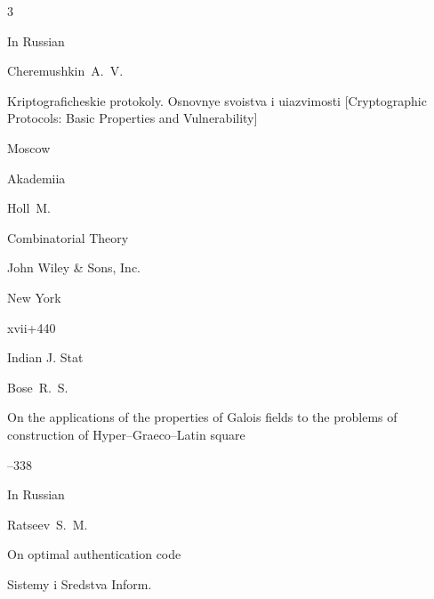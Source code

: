 \newpage



\EngRef







\begin{thebibliography}{3}




\lang In Russian

\by Cheremushkin~A.~V.

\book Kriptograficheskie protokoly. Osnovnye svoistva i uiazvimosti \rm [Cryptographic Protocols: Basic Properties and Vulnerability]

\publaddr Moscow

\publ Akademiia








\by Holl~M.

\book  Combinatorial Theory 


\publ John Wiley \& Sons, Inc.

\publaddr New York

\totalpages xvii+440







\jour  Indian J. Stat

\by    Bose~R.~S.

\paper On the applications of the properties of Galois fields to the problems of construction of Hyper--Graeco--Latin square




--338




\lang In Russian

\by Ratseev~S.~M.

\paper On optimal authentication code

\jour Sistemy i Sredstva Inform.


\end{thebibliography}
